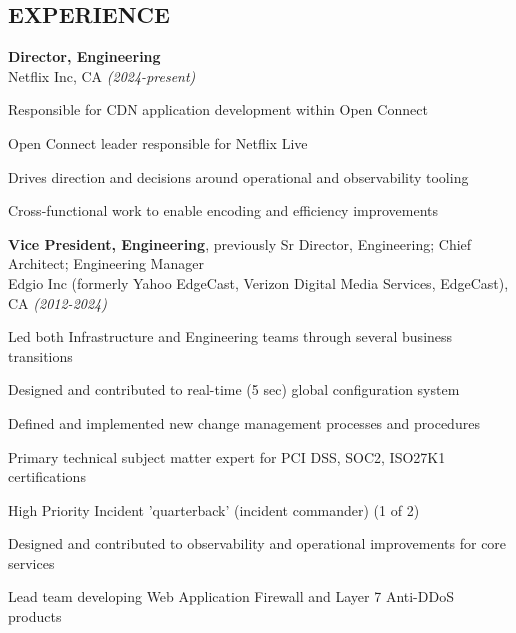 \documentclass[margin]{res}
\begin{document}
\begin{resume}
\section{EXPERIENCE}
\noindent
{\bf Director, Engineering}\\
Netflix Inc, CA {\em (2024-present)}
\begin{list}{}{\leftmargin=1.5em \topsep=5pt \partopsep=0pt \parsep=2.5pt}
  \item Responsible for CDN application development within Open Connect
  \item Open Connect leader responsible for Netflix Live
  \item Drives direction and decisions around operational and observability tooling
  \item Cross-functional work to enable encoding and efficiency improvements
\end{list}

{\bf Vice President, Engineering}, previously Sr Director, Engineering; Chief Architect; Engineering Manager\\
Edgio Inc (formerly Yahoo EdgeCast, Verizon Digital Media Services, EdgeCast), CA {\em (2012-2024)}
\begin{list}{}{\leftmargin=1.5em \topsep=5pt \partopsep=0pt \parsep=2.5pt}
  \item Led both Infrastructure and Engineering teams through several business transitions
  \item Designed and contributed to real-time (5 sec) global configuration system
  \item Defined and implemented new change management processes and procedures
  \item Primary technical subject matter expert for PCI DSS, SOC2, ISO27K1 certifications
  \item High Priority Incident 'quarterback' (incident commander) (1 of 2)
  \item Designed and contributed to observability and operational improvements for core services
  \item Lead team developing Web Application Firewall and Layer 7 Anti-DDoS products
\end{list}


\end{resume}
\end{document}
